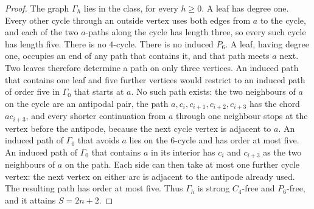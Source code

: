 \documentclass[ASNA]{USG}
\theoremstyle{WBstyletwo}
\numberwithin{equation}{section}
\begin{document}
\begin{proof}
The graph $\Gamma_h$ lies in the class, for every $h\ge 0$. A leaf has degree one. Every other cycle through an outside vertex uses both edges from $a$ to the cycle, and each of the two $a$-paths along the cycle has length three, so every such cycle has length five. There is no $4$-cycle. There is no induced $P_6$. A leaf, having degree one, occupies an end of any path that contains it, and that path meets $a$ next. Two leaves therefore determine a path on only three vertices. An induced path that contains one leaf and five further vertices would restrict to an induced path of order five in $\Gamma_0$ that starts at $a$. No such path exists: the two neighbours of $a$ on the cycle are an antipodal pair, the path $a,c_i,c_{i+1},c_{i+2},c_{i+3}$ has the chord $ac_{i+3}$, and every shorter continuation from $a$ through one neighbour stops at the vertex before the antipode, because the next cycle vertex is adjacent to $a$. An induced path of $\Gamma_0$ that avoids $a$ lies on the $6$-cycle and has order at most five. An induced path of $\Gamma_0$ that contains $a$ in its interior has $c_i$ and $c_{i+3}$ as the two neighbours of $a$ on the path. Each side can then take at most one further cycle vertex: the next vertex on either arc is adjacent to the antipode already used. The resulting path has order at most five. Thus $\Gamma_h$ is strong $C_4$-free and $P_6$-free, and it attains $S=2n+2$.


\end{proof}
\end{document}
